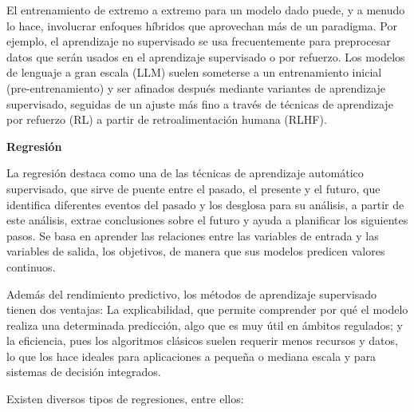 El entrenamiento de extremo a extremo para un modelo dado puede, y a menudo lo hace, involucrar enfoques híbridos que aprovechan más de un paradigma. Por ejemplo, el aprendizaje no supervisado se usa frecuentemente para preprocesar datos que serán usados en el aprendizaje supervisado o por refuerzo. Los modelos de lenguaje a gran escala (LLM) suelen someterse a un entrenamiento inicial (pre-entrenamiento) y ser afinados después mediante variantes de aprendizaje supervisado, seguidas de un ajuste más fino a través de técnicas de aprendizaje por refuerzo (RL) a partir de retroalimentación humana (RLHF).

\textbf{Regresión} \citep{lee2026,opit2023}

La regresión destaca como una de las técnicas de aprendizaje automático supervisado, que sirve de puente entre el pasado, el presente y el futuro, que identifica diferentes eventos del pasado y los desglosa para su análisis, a partir de este análisis, extrae conclusiones sobre el futuro y ayuda a planificar los siguientes pasos. Se basa en aprender las relaciones entre las variables de entrada y las variables de salida, los objetivos, de manera que sus modelos predicen valores continuos.

Además del rendimiento predictivo, los métodos de aprendizaje supervisado tienen dos ventajas: La explicabilidad, que permite comprender por qué el modelo realiza una determinada predicción, algo que es muy útil en ámbitos regulados; y la eficiencia, pues los algoritmos clásicos suelen requerir menos recursos y datos, lo que los hace ideales para aplicaciones a pequeña o mediana escala y para sistemas de decisión integrados.

Existen diversos tipos de regresiones, entre ellos:

